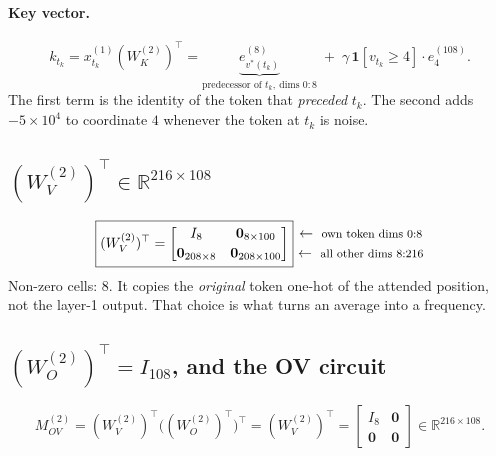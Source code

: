 \documentclass[11pt]{article}
\newcommand{\R}{\mathbb{R}}
\newcommand{\Wk}{W_K}
\newcommand{\Wv}{W_V}
\newcommand{\Wo}{W_O}
\newcommand{\rowlab}[1]{\ \leftarrow\ \text{\footnotesize #1}}
\begin{document}
\paragraph{Key vector.}
\begin{equation}
k_{t_k}=x^{(1)}_{t_k}(\Wk^{(2)})^\top
=\underbrace{e^{(8)}_{v^*(t_k)}}_{\text{predecessor of }t_k,\ \text{dims }0:8}
\;+\;\gamma\,\bm{1}[v_{t_k}\ge4]\cdot e^{(108)}_{4}.
\end{equation}
The first term is the identity of the token that \emph{preceded} $t_k$. The second adds
$-5\times10^4$ to coordinate $4$ whenever the token at $t_k$ is noise.

\subsection{$(\Wv^{(2)})^\top\in\R^{216\times108}$}
\begin{equation}
\boxed{(\Wv^{(2)})^\top=
\begin{bmatrix}
I_8 & \bm{0}_{8\times100}\\[2pt]
\bm{0}_{208\times8} & \bm{0}_{208\times100}
\end{bmatrix}}
\begin{matrix}
\rowlab{own token dims $0{:}8$}\\[2pt]
\rowlab{all other dims $8{:}216$}
\end{matrix}
\end{equation}
Non-zero cells: $8$. It copies the \emph{original} token one-hot of the attended position, not the
layer-1 output. That choice is what turns an average into a frequency.

\subsection{$(\Wo^{(2)})^\top=I_{108}$, and the OV circuit}
\begin{equation}
M^{(2)}_{OV}=(\Wv^{(2)})^\top\bigl((\Wo^{(2)})^\top\bigr)^\top=(\Wv^{(2)})^\top
=\begin{bmatrix}I_8&\bm{0}\\\bm{0}&\bm{0}\end{bmatrix}\in\R^{216\times108}.
\end{equation}
\end{document}
